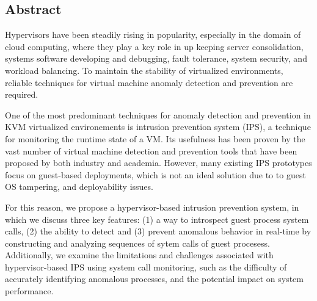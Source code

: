 \documentclass{report}
\begin{document}
\begin{spacing}{1.5}











\newpage
{}
\chapter*{Abstract}

{\large
Hypervisors have been steadily rising in popularity, especially in the domain of cloud computing, where they play a key role in up keeping server consolidation, systems software developing and debugging, fault tolerance, system security, and workload balancing. To maintain the stability of virtualized environments, reliable techniques for virtual machine anomaly detection and prevention are required.
\newline
}

{\large
\noindent One of the most predominant techniques for anomaly detection and prevention in KVM virtualized environements is intrusion prevention system (IPS), a technique for monitoring the runtime state of a VM. Its usefulness has been proven by the vast number of virtual machine detection and prevention tools that have been proposed by both industry and academia. However, many existing IPS prototypes focus on guest-based deployments, which is not an ideal solution due to to guest OS tampering, and deployability issues.
\leavevmode\newline
}

{\large
\noindent For this reason, we propose a hypervisor-based intrusion prevention system, in which we discuss three key features: (1) a way to introspect guest process system calls, (2) the ability to detect and (3) prevent anomalous behavior in real-time by constructing and analyzing sequences of sytem calls of guest procesess. Additionally, we examine the limitations and challenges associated with hypervisor-based IPS using system call monitoring, such as the difficulty of accurately identifying anomalous processes, and the potential impact on system performance.
\leavevmode\newline
}


\end{spacing}
\end{document}
